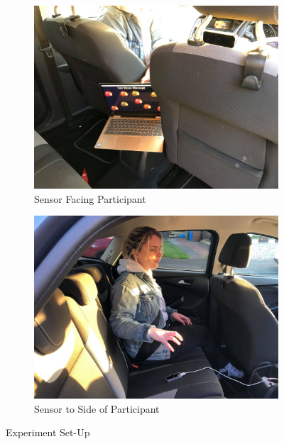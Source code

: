 \documentclass{l4proj}
\begin{document}
\begin{figure}[!htb]
    \centering
    \begin{subfigure}[b]{0.45\textwidth}
        \includegraphics[scale = 0.08]{images/experimentSetUp1.jpg}
        \caption{Sensor Facing Participant}
        \label{fig:setUp1}
    \end{subfigure}
    \begin{subfigure}[b]{0.45\textwidth}
        \includegraphics[scale = 0.08]{images/experimentSetUp2.jpg}
        \caption{Sensor to Side of Participant}
        \label{fig:setUp2}
    \end{subfigure}
    \caption{Experiment Set-Up}
    \label{fig:expSetUp}
\end{figure}
\end{document}
